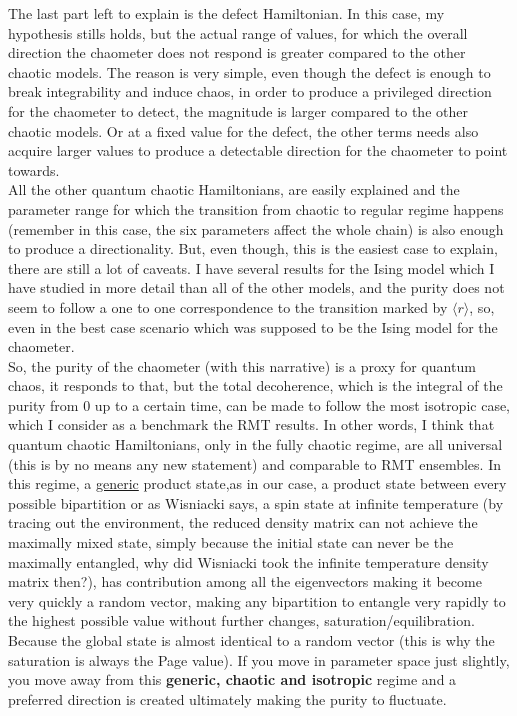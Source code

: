 The last part left to explain is the defect Hamiltonian. In this case, my hypothesis stills holds, but the actual range of values, for which the overall direction the chaometer does not respond is greater compared to the other chaotic models. The reason is very simple, even though the defect is enough to break integrability and induce chaos, in order to produce a privileged direction for the chaometer to detect, the magnitude is larger compared to the other chaotic models. Or at a fixed value for the defect, the other terms needs also acquire larger values to produce a detectable direction for the chaometer to point towards.\\

All the other quantum chaotic Hamiltonians, are easily explained and the parameter range for which the transition from chaotic to regular regime happens (remember in this case, the six parameters affect the whole chain) is also enough to produce a directionality. But, even though, this is the easiest case to explain, there are still a lot of caveats. I have several results for the Ising model which I have studied in more detail than all of the other models, and the purity does not seem to follow a one to one correspondence to the transition marked by $\langle r\rangle$, so, even in the best case scenario which was supposed to be the Ising model for the chaometer.\\

So, the purity of the chaometer (with this narrative) is a proxy for quantum chaos, it responds to that, but the total decoherence, which is the integral of the purity from 0 up to a certain time, can be made to follow the most isotropic case, which I consider as a benchmark the RMT results. In other words, I think that quantum chaotic Hamiltonians, only in the fully chaotic regime, are all universal (this is by no means any new statement) and comparable to RMT ensembles. In this regime, a \underline{generic} product state,as in our case, a product state between every possible bipartition or as Wisniacki says, a spin state at infinite temperature (by tracing out the environment, the reduced density matrix can not achieve the maximally mixed state, simply because the initial state can never be the maximally entangled, why did Wisniacki took the infinite temperature density matrix then?), has contribution among all the eigenvectors making it become very quickly a random vector, making any bipartition to entangle very rapidly to the highest possible value without further changes, saturation/equilibration. Because the global state is almost identical to a random vector (this is why the saturation is always the Page value). If you move in parameter space just slightly, you move away from this \textbf{generic, chaotic and isotropic} regime and a preferred direction is created ultimately making the purity to fluctuate.\\

